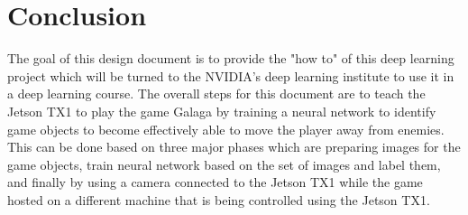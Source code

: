 \documentclass{scrreprt}
\begin{document}
\chapter{Conclusion}
The goal of this design document is to provide the "how to" of this deep learning project which will be turned to the NVIDIA's deep learning institute to use it in a deep learning course.
The overall steps for this document are to teach the Jetson TX1 to play the game Galaga by training a neural network to identify game objects to become effectively able to move the player away from enemies.
This can be done based on three major phases which are preparing images for the game objects, train neural network based on the set of images and label them, and finally by using a camera connected to the Jetson TX1 while the game hosted on a different machine that is being controlled using the Jetson TX1.
\end{document}
